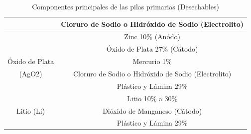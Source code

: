 \begin{table}[!htbp]
\begin{tabular}{|c|c|}
                         & Cloruro de Sodio o Hidróxido de Sodio (Electrolito)\\
                         \hline
                         & Zinc 10\% (Anódo)\\
                         & Óxido de Plata 27\% (Cátodo)\\
                         Óxido de Plata & Mercurio 1\%\\
                         (AgO2) & Cloruro de Sodio o Hidróxido de Sodio (Electrolito)\\
                         & Plástico y Lámina 29\%\\
                         \hline
                         & Litio 10\% a 30\%\\
                         Litio (Li) & Dióxido de Manganeso (Cátodo)\\
                         & Plástico y Lámina 29\%\\
                         \hline
                    \end{tabular}
                    \caption{Componentes principales de las pilas primarias (Desechables)}
                    \label{tab:1}
                \end{table}

